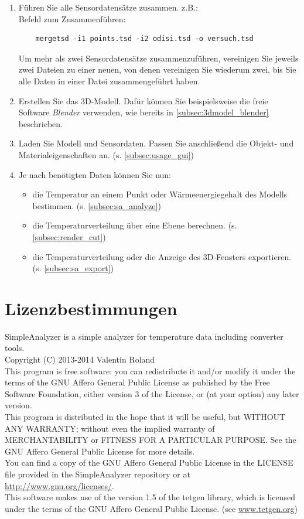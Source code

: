 \documentclass[10pt,a5paper,twoside,titlepage]{scrartcl}
\begin{document}
\begin{enumerate}
	\item Führen Sie alle Sensordatensätze zusammen. z.B.:\\
	Befehl zum Zusammenführen:
	\begin{lstlisting}
	mergetsd -i1 points.tsd -i2 odisi.tsd -o versuch.tsd
	\end{lstlisting}	
	Um mehr als zwei Sensordatensätze zusammenzuführen, vereinigen Sie jeweils zwei Dateien zu einer neuen, von denen vereinigen Sie wiederum zwei, bis Sie alle Daten in einer Datei zusammengeführt haben.
	\item Erstellen Sie das 3D-Modell. Dafür können Sie beispielsweise die freie Software \emph{Blender} verwenden, wie bereits in \ref{subsec:3dmodel_blender} beschrieben.
	\item Laden Sie Modell und Sensordaten. Passen Sie anschließend die Objekt- und Materialeigenschaften an. (s. \ref{subsec:usage_gui})
	\item Je nach benötigten Daten können Sie nun:
	\begin{itemize}
	\item die Temperatur an einem Punkt oder Wärmeenergiegehalt des Modells bestimmen. (s. \ref{subsec:sa_analyze})
	\item die Temperaturverteilung über eine Ebene berechnen. (s. \ref{subsec:render_cut})
	\item die Temperaturverteilung oder die Anzeige des 3D-Fensters exportieren. (s. \ref{subsec:sa_export})
	\end{itemize}
	\end{enumerate}
	\label{sec:example}
	
\newpage
\section{Lizenzbestimmungen}

SimpleAnalyzer is a simple analyzer for temperature data including converter tools. \\
Copyright (C) 2013-2014 Valentin Roland\\

This program is free software: you can redistribute it and/or
modify it under the terms of the GNU Affero General Public License
as published by the Free Software Foundation, either version 3 of
the License, or (at your option) any later version.\\

This program is distributed in the hope that it will be useful,
but WITHOUT ANY WARRANTY; without even the implied warranty of
MERCHANTABILITY or FITNESS FOR A PARTICULAR PURPOSE.  See the GNU
Affero General Public License for more details.\\

You can find a copy of the GNU Affero General Public License in the LICENSE file provided in the SimpleAnalyzer repository or at \url{http://www.gnu.org/licenses/}.\\

This software makes use of the version 1.5 of the tetgen library, which is licensed under the terms of the GNU Affero General Public License. (see \url{www.tetgen.org})
\end{document}
